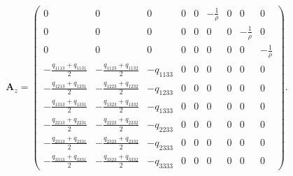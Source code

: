 \begin{displaymath}
\mathbf{A}_z =
\left( \begin{array}{cccccccccccc}
0 & 0 & 0 & 0 & 0 & -\frac 1 \rho & 0 & 0 & 0 \\ 
0 & 0 & 0 & 0 & 0 & 0 & 0 & -\frac 1 \rho & 0 \\ 
0 & 0 & 0 & 0 & 0 & 0 & 0 & 0 & -\frac 1 \rho \\ 
-\frac{q_{1113}+q_{1131}}{2} & -\frac{q_{1123}+q_{1132}}{2} & -q_{1133} & 0 & 0 & 0 & 0 & 0 & 0 \\ 
-\frac{q_{1213}+q_{1231}}{2} & -\frac{q_{1223}+q_{1232}}{2} & -q_{1233} & 0 & 0 & 0 & 0 & 0 & 0 \\ 
-\frac{q_{1313}+q_{1331}}{2} & -\frac{q_{1323}+q_{1332}}{2} & -q_{1333} & 0 & 0 & 0 & 0 & 0 & 0 \\ 
-\frac{q_{2213}+q_{2231}}{2} & -\frac{q_{2223}+q_{2232}}{2} & -q_{2233} & 0 & 0 & 0 & 0 & 0 & 0 \\ 
-\frac{q_{2313}+q_{2331}}{2} & -\frac{q_{2323}+q_{2332}}{2} & -q_{2333} & 0 & 0 & 0 & 0 & 0 & 0 \\ 
-\frac{q_{3313}+q_{3331}}{2} & -\frac{q_{3323}+q_{3332}}{2} & -q_{3333} & 0 & 0 & 0 & 0 & 0 & 0  
\end{array} \right).
\end{displaymath}
